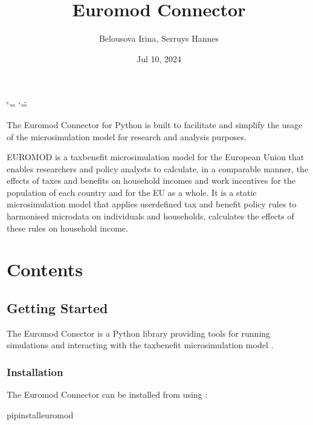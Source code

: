 \documentclass[letterpaper,10pt,english]{sphinxmanual}
\title{Euromod Connector}
\date{Jul 10, 2024}
\author{Belousova Irina, Serruys Hannes}
\begin{document}
\ifdefined\shorthandoff
  \ifnum\catcode`\=\string=\active\shorthandoff{=}\fi
  \ifnum\catcode`\"=\active{}\fi
\fi

\pagestyle{empty}
\sphinxmaketitle
\pagestyle{plain}
\sphinxtableofcontents
\pagestyle{normal}
\label{\detokenize{index::doc}}


\sphinxAtStartPar
The Euromod Connector for Python is built to facilitate and simplify the usage of the  microsimulation model for research and analysis purposes.

\sphinxAtStartPar
EUROMOD is a tax\sphinxhyphen{}benefit microsimulation model for the European Union that enables researchers and policy analysts to calculate, in a comparable manner, the effects of taxes and benefits on household incomes and work incentives for the population of each country and for the EU as a whole. It is a static microsimulation model that applies user\sphinxhyphen{}defined tax and benefit policy rules to harmonised microdata on individuals and households, calculates the effects of these rules on household income.


\chapter{Contents}
\label{\detokenize{index:contents}}
\sphinxstepscope


\section{Getting Started}
\label{\detokenize{getstarted:getting-started}}\label{\detokenize{getstarted::doc}}
\sphinxAtStartPar
The Euromod Conector is a Python library providing tools for running simulations and interacting with the tax\sphinxhyphen{}benefit microsimulation model .


\subsection{Installation}
\label{\detokenize{getstarted:installation}}
\sphinxAtStartPar
The Euromod Connector can be installed from   using :

\begin{sphinxVerbatim}[commandchars=\\\{\}]
\PYGZdl{}pipinstalleuromod
\end{sphinxVerbatim}
\end{document}
